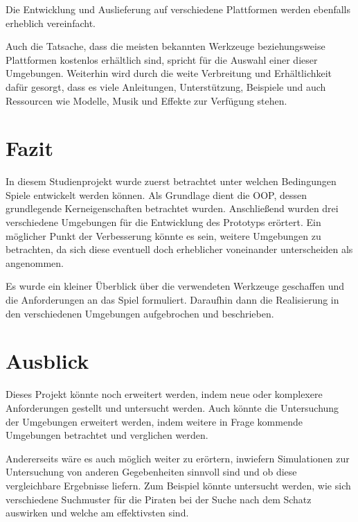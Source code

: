 \documentclass[
	12pt, %
	a4paper,
	listof=totoc, %
	bibliography=totoc, %
	numbers=noenddot, %
	ngerman, %
	headsepline, %
	oneside %
	]{scrbook} %
\begin{document}
Die Entwicklung und Auslieferung auf verschiedene Plattformen werden ebenfalls erheblich vereinfacht.

Auch die Tatsache, dass die meisten bekannten Werkzeuge beziehungsweise Plattformen kostenlos erhältlich sind, spricht für die Auswahl einer dieser Umgebungen. Weiterhin wird durch die weite Verbreitung und Erhältlichkeit dafür gesorgt, dass es viele Anleitungen, Unterstützung, Beispiele und auch Ressourcen wie Modelle, Musik und Effekte zur Verfügung stehen.

\chapter{Fazit}
In diesem Studienprojekt wurde zuerst betrachtet unter welchen Bedingungen Spiele entwickelt werden können. Als Grundlage dient die \gls{OOP}, dessen grundlegende Kerneigenschaften betrachtet wurden.
Anschließend wurden drei verschiedene Umgebungen für die Entwicklung des Prototyps erörtert.  
Ein möglicher Punkt der Verbesserung könnte es sein, weitere Umgebungen zu betrachten, da sich diese eventuell doch erheblicher voneinander unterscheiden als angenommen.  
  
Es wurde ein kleiner Überblick über die verwendeten Werkzeuge geschaffen und die Anforderungen an das Spiel formuliert. Daraufhin dann die Realisierung in den verschiedenen Umgebungen aufgebrochen und beschrieben.


\chapter{Ausblick}
Dieses Projekt könnte noch erweitert werden, indem neue oder komplexere Anforderungen gestellt und untersucht werden. Auch könnte die Untersuchung der Umgebungen erweitert werden, indem weitere in Frage kommende Umgebungen betrachtet und verglichen werden.  
  
Andererseits wäre es auch möglich weiter zu erörtern, inwiefern Simulationen zur Untersuchung von anderen Gegebenheiten sinnvoll sind und ob diese vergleichbare Ergebnisse liefern. Zum Beispiel könnte untersucht werden, wie sich verschiedene Suchmuster für die Piraten bei der Suche nach dem Schatz auswirken und welche am effektivsten sind.


\end{document}

